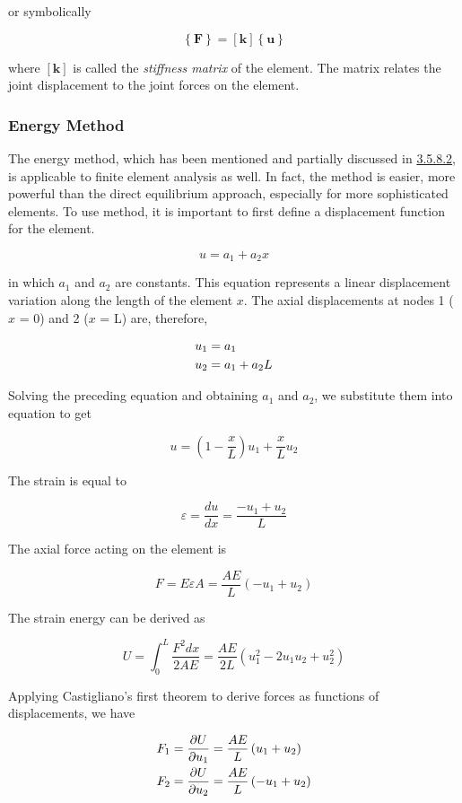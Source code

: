 \documentclass[a4paper,openany,nobib]{tufte-book}
\begin{document}
{{or symbolically

$$\left\{ \mathbf{F} \right\} = \left[ \mathbf{k} \right]\left\{ \mathbf{u} \right\}$$

where \([\mathbf{k}]\) is called the \emph{stiffness matrix} of the element.
The matrix relates the joint displacement to the joint forces on the
element.

\subsubsection{Energy Method}
\label{energy-method}
The energy method, which has been mentioned and partially discussed in
\hyperref[subsub: energy method]{3.5.8.2}, is applicable to finite element
analysis as well. In fact, the method is easier, more powerful than the
direct equilibrium approach, especially for more sophisticated elements.
To use method, it is important to first define a displacement function
for the element.

$$u = a_1 + a_2x$$

in which \(a_1\) and \(a_2\) are constants. This equation represents a
linear displacement variation along the length of the element \(x\). The
axial displacements at nodes 1 (\(x\) = 0) and 2 (\(x\) = L) are, therefore,

$$\begin{gathered}
  u_1 = a_1 \hfill \\
  u_2 = a_1 + a_2L \hfill \\ 
\end{gathered}$$

Solving the preceding equation and obtaining \(a_1\) and \(a_2\), we
substitute them into equation to get

$$u = \left( 1 - \frac{x}{L} \right)u_1 + \frac{x}{L}u_2$$

The strain is equal to

$$\varepsilon  = \frac{du}{dx} = \frac{-u_1 + u_2}{L}$$

The axial force acting on the element is

$$F = E\varepsilon A = \frac{{AE}}{L}( - {u_1} + {u_2})$$

The strain energy can be derived as

$$U = \int_0^L \frac{F^2dx}{2AE} = \frac{AE}{2L}\left( u_1^2 - 2u_1u_2 + u_2^2 \right)$$

Applying Castigliano's first theorem to derive forces as functions of
displacements, we have

\begin{gather}
\label{eqn: stiffness matrix energy}
  F_1 = \frac{\partial U}{\partial u_1} = \frac{AE}{L}\left( u_1 + u_2 \right) \hfill \\
  F_2 = \frac{\partial U}{\partial u_2} = \frac{AE}{L}\left( -u_1 + u_2 \right) \hfill \\ 
\end{gather}

}}
\end{document}
